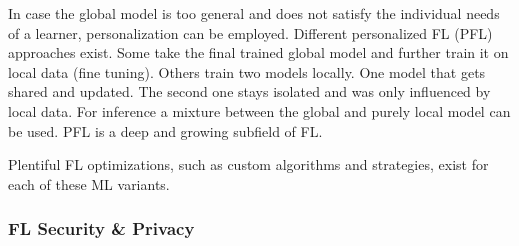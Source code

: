 In case the global model is too general and does not satisfy the individual needs
of a learner, personalization can be employed.
Different personalized FL (PFL) approaches exist.
Some take the final trained global model and further train it on local data (fine tuning).
Others train two models locally.
One model that gets shared and updated.
The second one stays isolated and was only influenced by local data.
For inference a mixture between the global and purely local model can be used.
PFL is a deep and growing subfield of FL.

Plentiful FL optimizations, such as custom algorithms and strategies,
exist for each of these ML variants.

\subsubsection{FL Security \& Privacy}